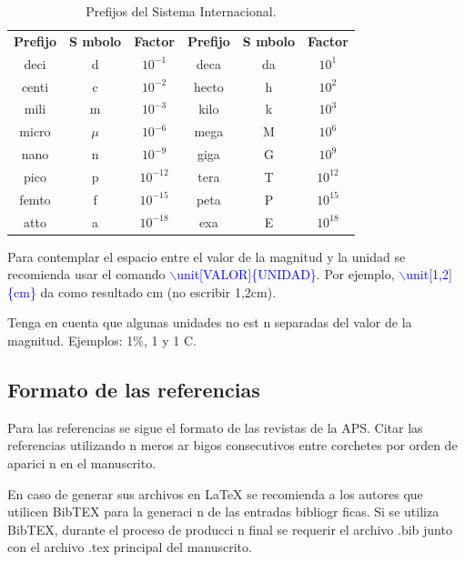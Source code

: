 \documentclass{article}
\begin{document}
\begin{table}[ht]
\caption{Prefijos del Sistema Internacional. }
\label{tab_03}
    \centering
    \small               %
    \begin{tabular}{|c|c|c|c|c|c|}
    \hline
    \centering
    \textbf{Prefijo} & \textbf{S mbolo} & \textbf{Factor} & \textbf{Prefijo} & \textbf{S mbolo} & \textbf{Factor}   \\ 
    \thickhline
    deci & d & $10^{-1}$ & deca & da &  $10^{1}$ \\ 
    \hline
    centi & c & $10^{-2}$ & hecto & h &  $10^{2}$  \\ 
    \hline
    mili & m & $10^{-3}$ & kilo & k &  $10^{3}$  \\
    \hline
    micro & $\mu$ & $10^{-6}$ & mega & M &  $10^{6}$  \\
    \hline
    nano & n & $10^{-9}$ & giga & G &  $10^{9}$  \\
    \hline
    pico & p & $10^{-12}$ & tera & T &  $10^{12}$   \\
    \hline
    femto & f & $10^{-15}$ & peta & P &  $10^{15}$  \\
    \hline
    atto & a & $10^{-18}$ & exa & E &  $10^{18}$   \\
    \hline
    \end{tabular}
\end{table}

\normalsize

Para contemplar el espacio entre el valor de la magnitud y la unidad se recomienda usar el comando 
\textcolor{Blue}{\textsf{$\backslash$unit[VALOR]\{UNIDAD\}}}. Por ejemplo, \textcolor{Blue}{\textsf{$\backslash$unit[1,2]\{cm\}}}  da como resultado \unit[1,2]{cm} (no escribir 1,2cm). 

Tenga en cuenta que algunas unidades no est n separadas del valor de la magnitud. Ejemplos: 1$\%$, 1  y 1 C.


\subsection{Formato de las referencias} 
Para las referencias se sigue el formato de las revistas de la APS. 
Citar las referencias utilizando n meros ar bigos consecutivos entre corchetes por orden de aparici n en el manuscrito. 

En caso de generar sus archivos en \LaTeX{} se recomienda a los autores que utilicen BibTEX para la generaci n de las entradas bibliogr ficas. Si se utiliza BibTEX, durante el proceso de producci n final se requerir  el archivo .bib  junto con el archivo .tex principal del manuscrito.
\end{document}
